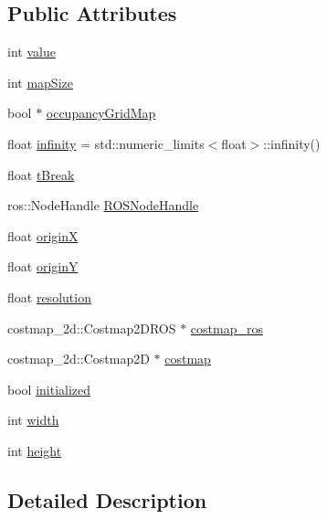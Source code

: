 \subsection*{Public Attributes}
\begin{DoxyCompactItemize}
\item 
int \hyperlink{classastar__plugin_1_1_a_star_planner_afb117804426fe5f1a9a882a0da06047a}{value}
\item 
int \hyperlink{classastar__plugin_1_1_a_star_planner_a5edf65eab6aa9be80520ebbcaa9e6704}{map\+Size}
\item 
bool $\ast$ \hyperlink{classastar__plugin_1_1_a_star_planner_a205a9cf7b62779627bf89c8b0d78f391}{occupancy\+Grid\+Map}
\item 
float \hyperlink{classastar__plugin_1_1_a_star_planner_a0d9b3ad5c3a83a96192609939af84c3d}{infinity} = std\+::numeric\+\_\+limits$<$float$>$\+::infinity()
\item 
float \hyperlink{classastar__plugin_1_1_a_star_planner_aae46db226358860bb296612e97a67617}{t\+Break}
\item 
ros\+::\+Node\+Handle \hyperlink{classastar__plugin_1_1_a_star_planner_ab20d703c7c32c96a523295cf07f8ef99}{R\+O\+S\+Node\+Handle}
\item 
float \hyperlink{classastar__plugin_1_1_a_star_planner_a9accb42a886464ae84db5259aad9c444}{originX}
\item 
float \hyperlink{classastar__plugin_1_1_a_star_planner_aa680b5cf31ff141738c409c4e86dbba6}{originY}
\item 
float \hyperlink{classastar__plugin_1_1_a_star_planner_a698245ae6075cbbcb7d50d949025df95}{resolution}
\item 
costmap\+\_\+2d\+::\+Costmap2\+D\+R\+OS $\ast$ \hyperlink{classastar__plugin_1_1_a_star_planner_a1be22c40d97241edb0a60b7bd3c332f3}{costmap\+\_\+ros}
\item 
costmap\+\_\+2d\+::\+Costmap2D $\ast$ \hyperlink{classastar__plugin_1_1_a_star_planner_afeaa9448af26fc54e8adb0a906bd6324}{costmap}
\item 
bool \hyperlink{classastar__plugin_1_1_a_star_planner_a3befa689d0be167cbde58b71c635f5ae}{initialized}
\item 
int \hyperlink{classastar__plugin_1_1_a_star_planner_a712676c797f8a99a81b7aa48e02d227b}{width}
\item 
int \hyperlink{classastar__plugin_1_1_a_star_planner_ad3806c8e75f4008de6b4ba1a1cbd2c42}{height}
\end{DoxyCompactItemize}


\subsection{Detailed Description}



